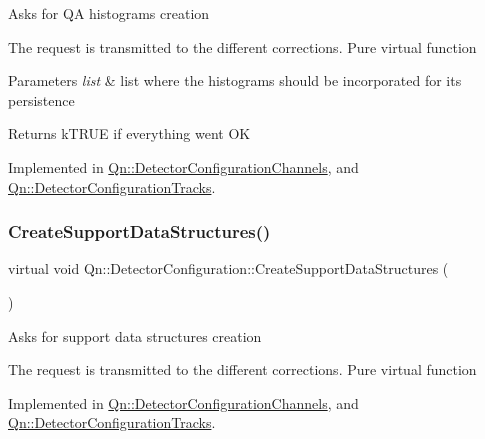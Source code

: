 Asks for QA histograms creation

The request is transmitted to the different corrections. Pure virtual function 
\begin{DoxyParams}{Parameters}
{\em list} & list where the histograms should be incorporated for its persistence \\
\hline
\end{DoxyParams}
\begin{DoxyReturn}{Returns}
k\+T\+R\+UE if everything went OK 
\end{DoxyReturn}


Implemented in \mbox{\hyperlink{classQn_1_1DetectorConfigurationChannels_a0e3a0e4775decda04c3bad48534c297a}{Qn\+::\+Detector\+Configuration\+Channels}}, and \mbox{\hyperlink{classQn_1_1DetectorConfigurationTracks_a4ccffb90904f7769abc11c09f5217337}{Qn\+::\+Detector\+Configuration\+Tracks}}.

\mbox{\label{classQn_1_1DetectorConfiguration_a664f65925f22f8f02c1a216f77b533ce}} 
\subsubsection{\texorpdfstring{Create\+Support\+Data\+Structures()}{CreateSupportDataStructures()}}
{\footnotesize\ttfamily virtual void Qn\+::\+Detector\+Configuration\+::\+Create\+Support\+Data\+Structures (\begin{DoxyParamCaption}{ }\end{DoxyParamCaption})\hspace{0.3cm}{\ttfamily [pure virtual]}}

Asks for support data structures creation

The request is transmitted to the different corrections. Pure virtual function 

Implemented in \mbox{\hyperlink{classQn_1_1DetectorConfigurationChannels_ab19e6fe4c194060859eef7941b1c716c}{Qn\+::\+Detector\+Configuration\+Channels}}, and \mbox{\hyperlink{classQn_1_1DetectorConfigurationTracks_aef11ff21d7c3fe4b612fe7c886023c7a}{Qn\+::\+Detector\+Configuration\+Tracks}}.

\mbox{\label{classQn_1_1DetectorConfiguration_a8e5e2eef94bca58a3dcf34fe5fbd1429}} 
